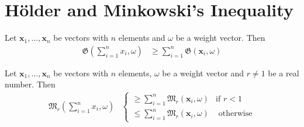 \documentclass[inequalities.tex]{subfile}
\begin{document}
	
	\section{H\"{o}lder and Minkowski's Inequality}\label{sec:holdmink}
	
		\begin{theorem}\label{thm:holder}
			Let $\mathbf{x}_{1},\ldots,\mathbf{x}_{n}$ be vectors with $n$ elements and $\omega$ be a weight vector. Then
				\begin{align*}
					\mathfrak{G}\left(\sum_{i=1}^{n}x_{i},\omega\right)
					& \geq \sum_{i=1}^{n}\mathfrak{G}(\mathbf{x}_{i},\omega)
				\end{align*}
		\end{theorem}
	
		\begin{theorem}\label{thm:mink}
			Let $\mathbf{x}_{1},\ldots,\mathbf{x}_{n}$ be vectors with $n$ elements, $\omega$ be a weight vector and $r\neq1$ be a real number. Then
				\begin{align*}
					\mathfrak{M}_{r}\left(\sum_{i=1}^{n}x_{i},\omega\right)
						&
							\begin{cases}
								\geq \sum_{i=1}^{n}\mathfrak{M}_{r}(\mathbf{x}_{i},\omega)& \mbox{if }r<1\\
								\leq \sum_{i=1}^{n}\mathfrak{M}_{r}(\mathbf{x}_{i}, \omega)& \mbox{ otherwise}
							\end{cases}
				\end{align*}
		\end{theorem}
\end{document}
